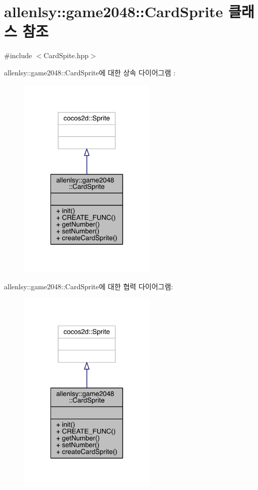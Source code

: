 \hypertarget{classallenlsy_1_1game2048_1_1_card_sprite}{}\section{allenlsy\+:\+:game2048\+:\+:Card\+Sprite 클래스 참조}
\label{classallenlsy_1_1game2048_1_1_card_sprite}


{\ttfamily \#include $<$Card\+Spite.\+hpp$>$}



allenlsy\+:\+:game2048\+:\+:Card\+Sprite에 대한 상속 다이어그램 \+: 
\nopagebreak
\begin{figure}[H]
\begin{center}
\leavevmode
\includegraphics[width=186pt]{classallenlsy_1_1game2048_1_1_card_sprite__inherit__graph}
\end{center}
\end{figure}


allenlsy\+:\+:game2048\+:\+:Card\+Sprite에 대한 협력 다이어그램\+:
\nopagebreak
\begin{figure}[H]
\begin{center}
\leavevmode
\includegraphics[width=186pt]{classallenlsy_1_1game2048_1_1_card_sprite__coll__graph}
\end{center}
\end{figure}
